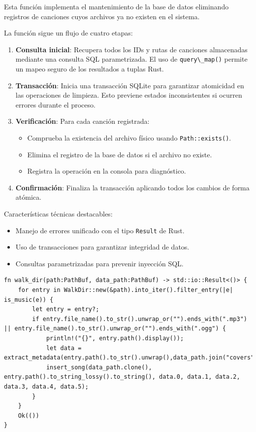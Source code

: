 \documentclass[11pt, a4paper]{article}
\begin{document}
            Esta función implementa el mantenimiento de la base de datos eliminando registros de canciones cuyos archivos ya no existen en el sistema.

            La función sigue un flujo de cuatro etapas:

            \begin{enumerate}
              \item \textbf{Consulta inicial}: Recupera todos los IDs y rutas de canciones almacenadas mediante una consulta SQL parametrizada. El uso de \verb|query\_map()| permite un mapeo seguro de los resultados a tuplas Rust.

              \item \textbf{Transacción}: Inicia una transacción SQLite para garantizar atomicidad en las operaciones de limpieza. Esto previene estados inconsistentes si ocurren errores durante el proceso.

              \item \textbf{Verificación}: Para cada canción registrada:
                \begin{itemize}
                  \item Comprueba la existencia del archivo físico usando \verb|Path::exists()|.
                  \item Elimina el registro de la base de datos si el archivo no existe.
                  \item Registra la operación en la consola para diagnóstico.
                \end{itemize}

              \item \textbf{Confirmación}: Finaliza la transacción aplicando todos los cambios de forma atómica.
            \end{enumerate}

            Características técnicas destacables:
            \begin{itemize}
              \item Manejo de errores unificado con el tipo \verb|Result| de Rust.
              \item Uso de transacciones para garantizar integridad de datos.
              \item Consultas parametrizadas para prevenir inyección SQL.
            \end{itemize}

            \begin{lstlisting}[caption={fn walk\_dir()}]
 fn walk_dir(path:PathBuf, data_path:PathBuf) -> std::io::Result<()> {
    for entry in WalkDir::new(&path).into_iter().filter_entry(|e| is_music(e)) {
        let entry = entry?;
        if entry.file_name().to_str().unwrap_or("").ends_with(".mp3") || entry.file_name().to_str().unwrap_or("").ends_with(".ogg") {
            println!("{}", entry.path().display());
            let data = extract_metadata(entry.path().to_str().unwrap(),data_path.join("covers"))?;
            insert_song(data_path.clone(), entry.path().to_string_lossy().to_string(), data.0, data.1, data.2, data.3, data.4, data.5);
        }
    }
    Ok(())
}
            \end{lstlisting}
\end{document}
